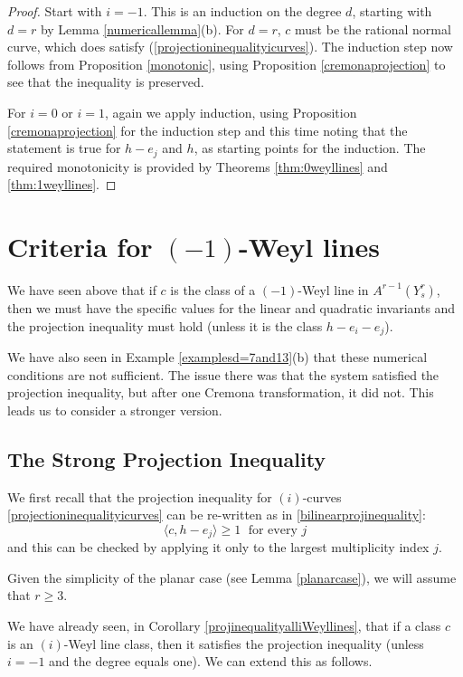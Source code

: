 \documentclass[12pt]{article}
\numberwithin{equation}{section}
\numberwithin{equation}{section}
\numberwithin{subeq}{equation}
\begin{document}
\begin{proof}
Start with $i=-1$.
This is an induction on the degree $d$,
starting with $d=r$ by Lemma \ref{numericallemma}(b).
For $d=r$, $c$ must be the rational normal curve, which does satisfy (\ref{projectioninequalityicurves}).
The induction step now follows from Proposition \ref{monotonic},
using Proposition \ref{cremonaprojection} to see that the inequality is preserved.

For $i=0$ or $i = 1$, again we apply induction,
using Proposition \ref{cremonaprojection} for the induction step
and this time noting that the statement is true for $h-e_j$ and $h$, as starting points for the induction.  The required monotonicity is provided by Theorems \ref{thm:0weyllines} and \ref{thm:1weyllines}.
\end{proof}

\section{Criteria for $(-1)$-Weyl lines}
We have seen above that if $c$ is the class of a $(-1)$-Weyl line in $A^{r-1}(Y^r_s)$,
then we must have the specific values for the linear and quadratic invariants
and the projection inequality must hold (unless it is the class $h-e_i-e_j$).

We have also seen in Example \ref{examplesd=7and13}(b) 
that these numerical conditions are not sufficient.
The issue there was that the system satisfied the projection inequality, but after one Cremona transformation, it did not.  This leads us to consider a stronger version.

\subsection{The Strong Projection Inequality}
We first recall that the projection inequality for $(i)$-curves \eqref{projectioninequalityicurves}
can be re-written as in \eqref{bilinearprojinequality}:
\[
\langle c,h-e_j\rangle \geq 1 \;\text{ for every } j
\]
and this can be checked by applying it only to the largest multiplicity index $j$.

Given the simplicity of the planar case (see Lemma \ref{planarcase}),
we will assume that $r \geq 3$.

We have already seen, in Corollary \ref{projinequalityalliWeyllines},
that if a class $c$ is an $(i)$-Weyl line class,
then it satisfies the projection inequality
(unless $i=-1$ and the degree equals one).
We can extend this as follows.
\end{document}
